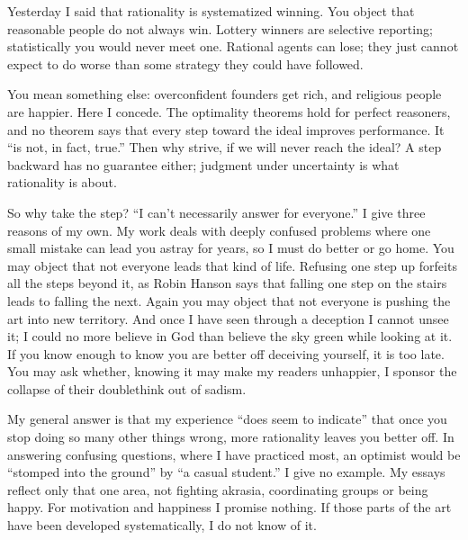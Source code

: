 
Yesterday I said that rationality is systematized winning.  You object that reasonable people do not always win. Lottery winners are selective reporting; statistically you would never meet one. Rational agents can lose; they just cannot expect to do worse than some strategy they could have followed.

You mean something else: overconfident founders get rich, and religious people are happier. Here I concede. The optimality theorems hold for perfect reasoners, and no theorem says that every step toward the ideal improves performance. It ``is not, in fact, true.'' Then why strive, if we will never reach the ideal? A step backward has no guarantee either; judgment under uncertainty is what rationality is about. 

So why take the step? ``I can't necessarily answer for everyone.'' I give three reasons of my own. My work deals with deeply confused problems where one small mistake can lead you astray for years, so I must do better or go home. You may object that not everyone leads that kind of life. Refusing one step up forfeits all the steps beyond it, as Robin Hanson says that falling one step on the stairs leads to falling the next. Again you may object that not everyone is pushing the art into new territory. And once I have seen through a deception I cannot unsee it; I could no more believe in God than believe the sky green while looking at it. If you know enough to know you are better off deceiving yourself, it is too late. You may ask whether, knowing it may make my readers unhappier, I sponsor the collapse of their doublethink out of sadism.

My general answer is that my experience ``does seem to indicate'' that once you stop doing so many other things wrong, more rationality leaves you better off. In answering confusing questions, where I have practiced most, an optimist would be ``stomped into the ground'' by ``a casual student.'' I give no example. My essays reflect only that one area, not fighting akrasia, coordinating groups or being happy. For motivation and happiness I promise nothing. If those parts of the art have been developed systematically, I do not know of it. 


